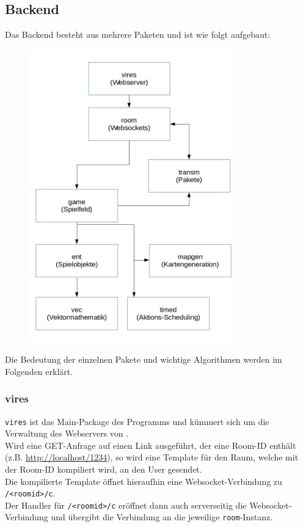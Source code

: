 \subsection{Backend}
Das Backend besteht aus mehrere Paketen und ist wie folgt aufgebaut:
\begin{figure}[H]
	\centering
	\includegraphics[width=0.8\textwidth]{Architektur.png}
\end{figure}
Die Bedeutung der einzelnen Pakete und wichtige Algorithmen werden im Folgenden erklärt.

\subsubsection{vires}
\verb+vires+ ist das Main-Package des Programms und kümmert sich um die Verwaltung des Webservers von \vires. \\
Wird eine GET-Anfrage auf einen Link ausgeführt, der eine Room-ID enthält (z.B. \url{http://localhost/1234}), so wird eine Template für den Raum, welche mit der Room-ID kompiliert wird, an den User gesendet. \\
Die kompilierte Template öffnet hieraufhin eine Websocket-Verbindung zu \verb+/<roomid>/c+. \\
Der Handler für \verb+/<roomid>/c+ eröffnet dann auch serverseitig die Websocket-Verbindung und übergibt die Verbindung an die jeweilige \verb+room+-Instanz.

